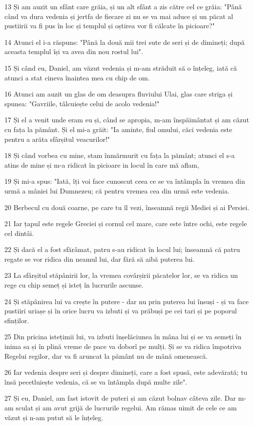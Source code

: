 \par 13 Și am auzit un sfânt care grăia, și un alt sfânt a zis către cel ce grăia: "Până când va dura vedenia și jertfa de fiecare zi nu se va mai aduce și un păcat al pustiirii va fi pus în loc și templul și oștirea vor fi călcate în picioare?"
\par 14 Atunci el i-a răspuns: "Până la două mii trei sute de seri și de dimineți; după aceasta templul își va avea din nou rostul lui".
\par 15 Și când eu, Daniel, am văzut vedenia și m-am străduit să o înțeleg, iată că atunci a stat cineva înaintea mea cu chip de om.
\par 16 Atunci am auzit un glas de om deasupra fluviului Ulai, glas care striga și spunea: "Gavriile, tâlcuiește celui de acolo vedenia!"
\par 17 Și el a venit unde eram eu și, când se apropia, m-am înspăimântat și am căzut cu fața la pământ. Și el mi-a grăit: "Ia aminte, fiul omului, căci vedenia este pentru a arăta sfârșitul veacurilor!"
\par 18 Și când vorbea cu mine, stam înmărmurit cu fața la pământ; atunci el s-a atins de mine și m-a ridicat în picioare in locul în care mă aflam,
\par 19 Și mi-a spus: "Iată, îți voi face cunoscut ceea ce se va întâmpla în vremea din urmă a mâniei lui Dumnezeu; că pentru vremea cea din urmă este vedenia.
\par 20 Berbecul cu două coarne, pe care tu îl vezi, înseamnă regii Mediei și ai Persiei.
\par 21 Iar țapul este regele Greciei și cornul cel mare, care este între ochi, este regele cel dintâi.
\par 22 Și dacă el a fost sfărâmat, patru s-au ridicat în locul lui; înseamnă că patru regate se vor ridica din neamul lui, dar fără să aibă puterea lui.
\par 23 La sfârșitul stăpânirii lor, la vremea covârșirii păcatelor lor, se va ridica un rege cu chip semeț și isteț în lucrurile ascunse.
\par 24 Și stăpânirea lui va crește în putere - dar nu prin puterea lui însuși - și va face pustiiri uriașe și în orice lucru va izbuti și va prăbuși pe cei tari și pe poporul sfinților.
\par 25 Din pricina istețimii lui, va izbuti înșelăciunea în mâna lui și se va semeți în inima sa și în plină vreme de pace va doborî pe mulți. Și se va ridica împotriva Regelui regilor, dar va fi aruncat la pământ nu de mână omenească.
\par 26 Iar vedenia despre seri și despre dimineți, care a fost spusă, este adevărată; tu însă pecetluiește vedenia, că se va întâmpla după multe zile".
\par 27 Și eu, Daniel, am fast istovit de puteri și am căzut bolnav câteva zile. Dar m-am sculat și am avut grijă de lucrurile regelui. Am rămas uimit de cele ce am văzut și n-am putut să le înțeleg.

